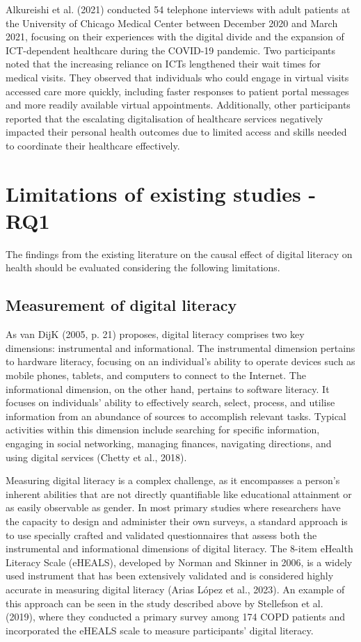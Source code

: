 Alkureishi et al. (2021) conducted 54 telephone interviews with adult patients at the University of Chicago Medical Center between December 2020 and March 2021, focusing on their experiences with the digital divide and the expansion of ICT-dependent healthcare during the COVID-19 pandemic. Two participants noted that the increasing reliance on ICTs lengthened their wait times for medical visits. They observed that individuals who could engage in virtual visits accessed care more quickly, including faster responses to patient portal messages and more readily available virtual appointments. Additionally, other participants reported that the escalating digitalisation of healthcare services negatively impacted their personal health outcomes due to limited access and skills needed to coordinate their healthcare effectively.

\section{Limitations of existing studies - RQ1}
The findings from the existing literature on the causal effect of digital literacy on health should be evaluated considering the following limitations.

\subsection{Measurement of digital literacy}
As van DijK (2005, p. 21) proposes, digital literacy comprises two key dimensions: instrumental and informational. The instrumental dimension pertains to hardware literacy, focusing on an individual's ability to operate devices such as mobile phones, tablets, and computers to connect to the Internet. The informational dimension, on the other hand, pertains to software literacy. It focuses on individuals' ability to effectively search, select, process, and utilise information from an abundance of sources to accomplish relevant tasks. Typical activities within this dimension include searching for specific information, engaging in social networking, managing finances, navigating directions, and using digital services (Chetty et al., 2018).

Measuring digital literacy is a complex challenge, as it encompasses a person's inherent abilities that are not directly quantifiable like educational attainment or as easily observable as gender. In most primary studies where researchers have the capacity to design and administer their own surveys, a standard approach is to use specially crafted and validated questionnaires that assess both the instrumental and informational dimensions of digital literacy. The 8-item eHealth Literacy Scale (eHEALS), developed by Norman and Skinner in 2006, is a widely used instrument that has been extensively validated and is considered highly accurate in measuring digital literacy (Arias López et al., 2023). An example of this approach can be seen in the study described above by Stellefson et al. (2019), where they conducted a primary survey among 174 COPD patients and incorporated the eHEALS scale to measure participants' digital literacy.

